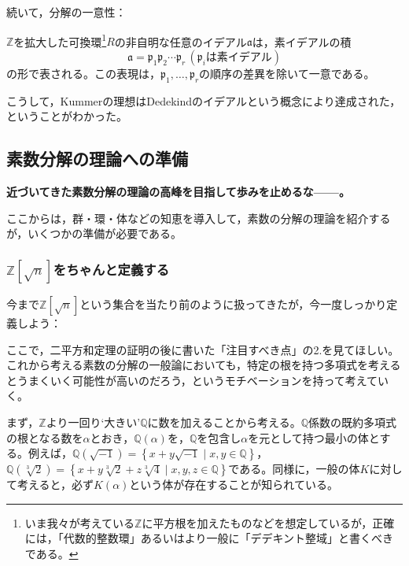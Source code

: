 続いて，分解の一意性：

\begin{thm}\label{prime_ideal_break}
    $\mathds{Z}$を拡大した可換環\footnote{いま我々が考えている$\mathds{Z}$に平方根を加えたものなどを想定しているが，正確には，「代数的整数環」あるいはより一般に「デデキント整域」と書くべきである。}$R$の非自明な任意のイデアル$\mathfrak{a}$は，素イデアルの積\[
    \mathfrak{a}=\mathfrak{p}_1\mathfrak{p}_2\cdots\mathfrak{p}_r\, (\mathfrak{p}_i\text{は素イデアル})
    \]の形で表される。この表現は，$\mathfrak{p}_1,\ldots,\mathfrak{p}_r$の順序の差異を除いて一意である。
\end{thm}

こうして，Kummerの理想はDedekindのイデアルという概念により達成された，ということがわかった。

\subsection{素数分解の理論への準備}
\textbf{近づいてきた素数分解の理論の高峰を目指して歩みを止めるな------。}

\vspace{10pt}

ここからは，群・環・体などの知恵を導入して，素数の分解の理論を紹介するが，いくつかの準備が必要である。

\subsubsection{\texorpdfstring{$\mathds{Z}[\sqrt{n}]$}{Z[sqrt{n}]}をちゃんと定義する}\label{zn_teigi}

今まで$\mathds{Z}[\sqrt{n}]$という集合を当たり前のように扱ってきたが，今一度しっかり定義しよう：

ここで，二平方和定理の証明の後に書いた「注目すべき点」の2.を見てほしい。これから考える素数の分解の一般論においても，特定の根を持つ多項式を考えるとうまくいく可能性が高いのだろう，というモチベーションを持って考えていく。

まず，$\mathds{Z}$より一回り`大きい'$\mathds{Q}$に数を加えることから考える。$\mathds{Q}$係数の既約多項式の根となる数を$\alpha$とおき，$\mathds{Q}(\alpha)$を，$\mathds{Q}$を包含し$\alpha$を元として持つ最小の体とする。例えば，$\mathds{Q}(\sqrt{-1})=\left\{x+y\sqrt{-1}\mid x,y\in\mathds{Q}\right\}$，$\mathds{Q}(\sqrt[3]{2})=\left\{x+y\sqrt[3]{2}+z\sqrt[3]{4}\mid x,y,z\in\mathds{Q}\right\}$である。同様に，一般の体$K$に対して考えると，必ず$K(\alpha)$という体が存在することが知られている。

